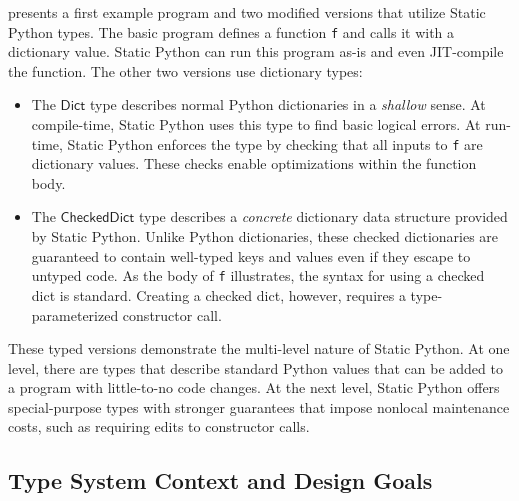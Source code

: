 \documentclass[english,cleveref,submission]{programming}
\newcommand{\SP}{Static Python}
\newcommand{\code}[1]{\texttt{#1}}
\newcommand{\typefont}[1]{\mathsf{#1}}
\newcommand{\sptrawpydict}{\typefont{Dict}}
\newcommand{\sptrawchkdict}{\typefont{CheckedDict}} %
\begin{document}
 presents a first example program and two modified versions that
utilize \SP{} types.
The basic program defines a function \code{f} and calls it with a dictionary
value.
\SP{} can run this program as-is and even JIT-compile the function.
The other two versions use dictionary types:
\begin{itemize}
  \item
    The $\sptrawpydict$ type describes normal Python dictionaries in a \emph{shallow} sense.
    At compile-time, \SP{} uses this type to find basic logical errors.
    At run-time, \SP{} enforces the type by checking that all inputs to \code{f} are
    dictionary values.
    These checks enable optimizations within the function body.

  \item
    The $\sptrawchkdict$ type
    describes a \emph{concrete} dictionary data structure provided by \SP{}.
    Unlike Python dictionaries, these checked dictionaries are guaranteed to
    contain well-typed keys and values even if they escape to untyped code.
    As the body of \code{f} illustrates, the syntax for using a checked dict is standard.
    Creating a checked dict, however, requires a type-parameterized constructor call.
\end{itemize}
These typed versions demonstrate the multi-level nature of \SP{}.
At one level, there are types that describe standard Python values that can be added
to a program with little-to-no code changes.
At the next level, \SP{} offers special-purpose types with stronger guarantees that impose
nonlocal maintenance costs, such as requiring edits to constructor calls.


\subsection{Type System Context and Design Goals}
\label{s:ts-context}
\end{document}
